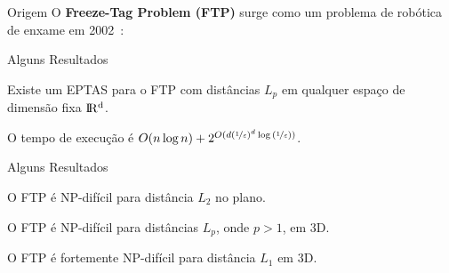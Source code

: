 \stopcounter
\begin{frame}{Origem}
  O \textbf{Freeze-Tag Problem (FTP)} surge como um problema de robótica de enxame em 2002~\cite{Arkin02}:
  \bigbreak
  \begin{minipage}{\linewidth}
    \centering
  \end{minipage}
\end{frame}
\inccounter

\begin{frame}{Alguns Resultados}
  \begin{thm}
    Existe um EPTAS para o FTP com distâncias $L_p$ em qualquer espaço de dimensão fixa $\rm I\!R^d$.
    \pause
    
    \medskip
    O tempo de execução é $O(n \log n) + 2^{O(d(\nicefrac{1}{\varepsilon})^d\log{(\nicefrac{1}{\varepsilon})})}$.
  \end{thm}
\end{frame}

\begin{frame}{Alguns Resultados}
  \begin{thm}
    O FTP é NP-difícil para distância $L_2$ no plano.
  \end{thm}

  \pause
  \begin{thm}
    O FTP é NP-difícil para distâncias $L_p$, onde $p>1$, em 3D.
  \end{thm}

  \pause
  \begin{thm}
    O FTP é fortemente NP-difícil para distância $L_1$ em 3D.
  \end{thm}
\end{frame}
